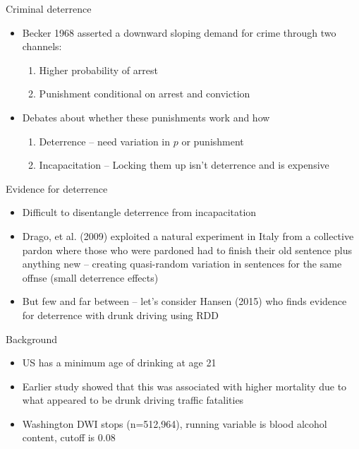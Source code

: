 \documentclass{beamer}
\begin{document}
\begin{frame}{Criminal deterrence}

\begin{itemize}
\item Becker 1968 asserted a downward sloping demand for crime through two channels:
	\begin{enumerate}
	\item Higher probability of arrest
	\item Punishment conditional on arrest and conviction
	\end{enumerate}
\item Debates about whether these punishments work and how
	\begin{enumerate}
	\item Deterrence -- need variation in $p$ or punishment
	\item Incapacitation -- Locking them up isn't deterrence and is expensive
	\end{enumerate}
\end{itemize}

\end{frame}

\begin{frame}{Evidence for deterrence}

\begin{itemize}
\item Difficult to disentangle deterrence from incapacitation
\item Drago, et al. (2009) exploited a natural experiment in Italy from a collective pardon where those who were pardoned had to finish their old sentence plus anything new -- creating quasi-random variation in sentences for the same offnse (small deterrence effects)
\item But few and far between -- let's consider Hansen (2015) who finds evidence for deterrence with drunk driving using RDD
\end{itemize}

\end{frame}

\begin{frame}{Background}

\begin{itemize}
\item US has a minimum age of drinking at age 21
\item Earlier study showed that this was associated with higher mortality due to what appeared to be drunk driving traffic fatalities
\item Washington DWI stops (n=512,964), running variable is blood alcohol content, cutoff is 0.08
\end{itemize}

\end{frame}
\end{document}
